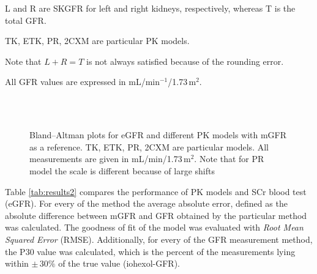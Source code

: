 \begin{landscape}
\begin{table}[H]
\begin{threeparttable}
\begin{tabular}
  \bottomrule

\end{tabular}
\begin{tablenotes}%
\footnotesize{}%
\item L and R are SKGFR for left and right kidneys, respectively, whereas T is the total GFR.
\item TK, ETK, PR, 2CXM are particular PK models. 
\item Note that $L+R = T$ is not always satisfied because of the rounding error.
\item All GFR values are expressed in mL/min$^{-1}$/1.73\,m$^2$.
    \end{tablenotes}
	\end{threeparttable}
\end{table}
\end{landscape}


\begin{figure}[H]
	\centering
	 \\ \vspace{10pt}  
 	 \hfill {} \\ \vspace{10pt}   
	 \hfill {}
\caption[Bland–Altman plots for different methods]{Bland–Altman plots for eGFR and different PK models with mGFR as a reference. TK, ETK, PR, 2CXM are particular models. All measurements are given in mL/min/1.73\,m$^2$. Note that for PR model the scale is different because of large shifts} 
\label{fig:baltman}
\end{figure}

Table \ref{tab:results2} compares the performance of PK models and SCr blood test (eGFR). For every of the method the average absolute error, defined as the absolute difference between mGFR and GFR obtained by the particular method was calculated.
The goodness of fit of the model was evaluated with \textit{Root Mean Squared Error} (RMSE). 
Additionally, for every of the GFR measurement method, the P30 value was calculated, which is the percent of the measurements lying within $\pm\,30\%$ of the true value (iohexol-GFR).

